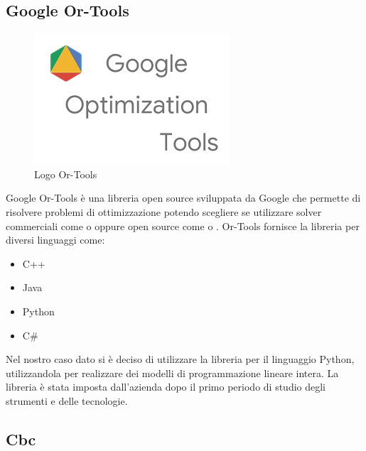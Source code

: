 \subsection{Google Or-Tools}
\begin{figure}[H]
	\begin{center} \includegraphics[scale=0.8]{figures/google_or_tools}
		\caption[Logo Or-Tools]{Logo Or-Tools}  
	\end{center}
\end{figure}
Google Or-Tools è una libreria open source sviluppata da Google che permette di risolvere problemi di ottimizzazione potendo scegliere se utilizzare solver commerciali come  o  oppure open source come  o . Or-Tools fornisce la libreria per diversi linguaggi come:
\begin{itemize}
	\item C++
	\item Java
	\item Python
	\item C\#
\end{itemize}
Nel nostro caso dato si è deciso di utilizzare la libreria per il linguaggio Python, utilizzandola per realizzare dei modelli di programmazione lineare intera. La libreria è stata imposta dall'azienda dopo il primo periodo di studio degli strumenti e delle tecnologie.

\subsection{Cbc}

